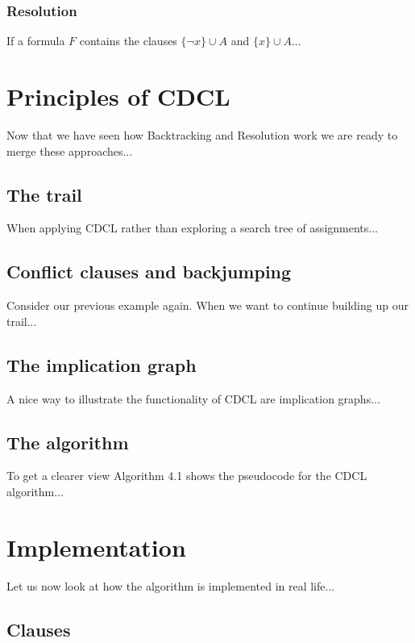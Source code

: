 \subsubsection{Resolution}

If a formula \(F\) contains the clauses \(\{\neg x\} \cup A\) and \(\{x\} \cup A\)...

\section{Principles of CDCL}

Now that we have seen how Backtracking and Resolution work we are ready to merge these approaches...

\subsection{The trail}

When applying CDCL rather than exploring a search tree of assignments...

\subsection{Conflict clauses and backjumping}

Consider our previous example again. When we want to continue building up our trail...

\subsection{The implication graph}

A nice way to illustrate the functionality of CDCL are implication graphs...

\subsection{The algorithm}

To get a clearer view Algorithm 4.1 shows the pseudocode for the CDCL algorithm...

\section{Implementation}

Let us now look at how the algorithm is implemented in real life...

\subsection{Clauses}

